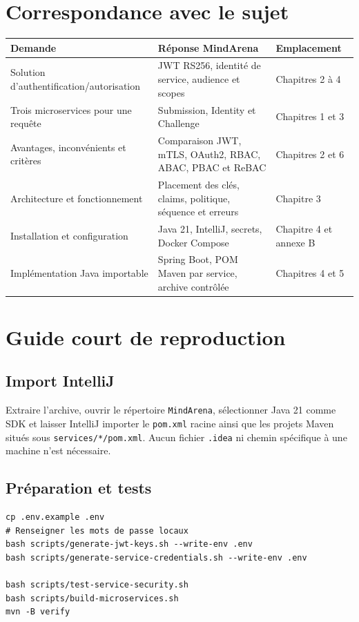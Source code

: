 \documentclass[12pt,a4paper,oneside]{report}
\newcommand{\code}[1]{\texttt{#1}}
\begin{document}
\chapter{Correspondance avec le sujet}
\begin{longtable}{P{5.1cm}P{6cm}P{2.6cm}}
\toprule
\textbf{Demande} & \textbf{Réponse MindArena} & \textbf{Emplacement} \\
\midrule
Solution d'authentification/autorisation & JWT RS256, identité de service, audience et scopes & Chapitres 2 à 4 \\
Trois microservices pour une requête & Submission, Identity et Challenge & Chapitres 1 et 3 \\
Avantages, inconvénients et critères & Comparaison JWT, mTLS, OAuth2, RBAC, ABAC, PBAC et ReBAC & Chapitres 2 et 6 \\
Architecture et fonctionnement & Placement des clés, claims, politique, séquence et erreurs & Chapitre 3 \\
Installation et configuration & Java 21, IntelliJ, secrets, Docker Compose & Chapitre 4 et annexe B \\
Implémentation Java importable & Spring Boot, POM Maven par service, archive contrôlée & Chapitres 4 et 5 \\
\bottomrule
\end{longtable}

\chapter{Guide court de reproduction}
\section{Import IntelliJ}
Extraire l'archive, ouvrir le répertoire \code{MindArena}, sélectionner Java 21
comme SDK et laisser IntelliJ importer le \code{pom.xml} racine ainsi que les
projets Maven situés sous \nolinkurl{services/*/pom.xml}. Aucun fichier \code{.idea}
ni chemin spécifique à une machine n'est nécessaire.

\section{Préparation et tests}
\begin{lstlisting}
cp .env.example .env
# Renseigner les mots de passe locaux
bash scripts/generate-jwt-keys.sh --write-env .env
bash scripts/generate-service-credentials.sh --write-env .env

bash scripts/test-service-security.sh
bash scripts/build-microservices.sh
mvn -B verify
\end{lstlisting}
\end{document}
